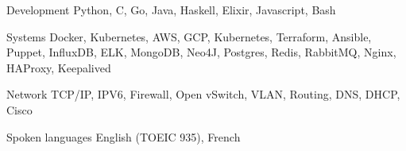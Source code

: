 


\begin{cvskills}


\cvskill
{Development} %
{Python, C, Go, Java, Haskell, Elixir, Javascript, Bash} %

	



\cvskill
{Systems} %
{Docker, Kubernetes, AWS, GCP, Kubernetes, Terraform, Ansible, Puppet, InfluxDB,\break
ELK, MongoDB, Neo4J, Postgres, Redis, RabbitMQ, Nginx, HAProxy, Keepalived} %



\cvskill
{Network} %
{TCP/IP, IPV6, Firewall, Open vSwitch, VLAN, Routing, DNS, DHCP, Cisco} %





\cvskill
{Spoken languages} %
{English (TOEIC 935), French} %


\end{cvskills}